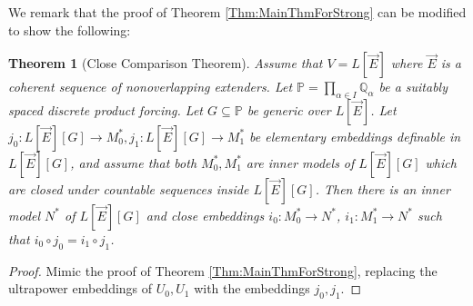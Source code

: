 \documentclass{article}
\theoremstyle{definition}
\newtheorem{question}[definition]{Question}
\theoremstyle{plain}
\newtheorem{theorem}[definition]{Theorem}
\newcommand{\po}{\mathbb{P}}
\newcommand{\qo}{\mathbb{Q}}
\begin{document}

We remark that the proof of Theorem \ref{Thm:MainThmForStrong} can be modified to show the following:

\begin{theorem}[Close Comparison Theorem]
    Assume that $V = L[\vec{E}]$ where $\vec{E}$ is a coherent sequence of nonoverlapping extenders. Let $\po = \prod_{\alpha\in I}\qo_\alpha$ be a suitably spaced discrete product forcing. Let $G\subseteq \po$ be generic over $L[\vec E]$. Let $j_0\colon L[\vec{E}][G]\to M^*_0, j_1\colon L[\vec{E}][G]\to M^*_1$ be elementary embeddings definable in $L[\vec{E}][G]$, and assume that both $M^*_0, M^*_1$ are inner models of $L[\vec{E}][G]$ which are closed under countable sequences inside $L[\vec E][G]$. Then there is an inner model $N^*$ of $L[\vec E][G]$ and close embeddings $i_0\colon M^*_0\to N^*$, $i_1\colon M^*_1\to N^*$ such that $i_0\circ j_0 = i_1\circ j_1$. 
\end{theorem}

\begin{proof}
    Mimic the proof of Theorem \ref{Thm:MainThmForStrong}, replacing the ultrapower embeddings of $U_0, U_1$ with the embeddings $j_0, j_1$.
\end{proof}





\end{document}
